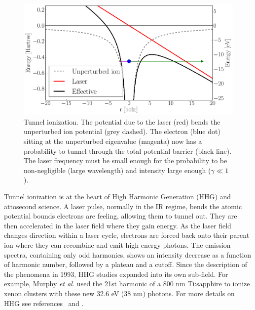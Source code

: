 \begin{figure}
 \centering
 \includegraphics[width=\figurewidth]{figures/ionization_tunnel}
 \caption{\label{fig:ionization:tunnel}Tunnel ionization. The potential
          due to the laser (red) bends the unperturbed ion potential
          (grey dashed). The electron (blue dot) sitting at the unperturbed
          eigenvalue (magenta) now has a probability to tunnel through the total
          potential barrier (black line). The laser frequency must be small
          enough for the probability to be non-negligible (large wavelength)
          and intensity large enough ($\gamma \ll 1$).}
\end{figure}

Tunnel ionization is at the heart of High Harmonic Generation (HHG) and
attosecond science\cite{Fennel2010}. A laser pulse, normally in the IR regime,
bends the atomic potential bounds electrons are feeling, allowing them to tunnel
out. They are then accelerated in the laser field where they gain energy.
As the laser field changes direction within a laser cycle, electrons are forced
back onto their parent ion where they can
recombine and emit high energy photons. The emission spectra,
containing only odd harmonics, shows an intensity decrease as a function of
harmonic number, followed by a plateau and a cutoff. Since the description
of the phenomena in 1993\cite{Corkum1993}, HHG studies expanded into its own
sub-field. For example, Murphy \textit{et al.} used the 21st harmonic of a
800 nm Ti:sapphire to ionize xenon clusters\cite{Murphy2008a,Murphy2008b}
with these new 32.6 eV (38 nm) photons.
For more details on HHG see references~\cite{Levesque2006} and
\cite{Lewenstein2008}.


